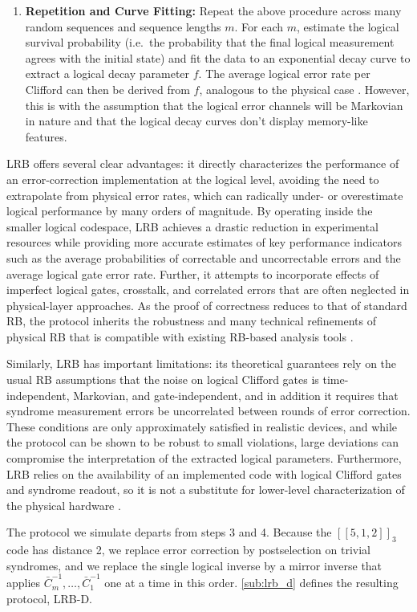 \begin{enumerate}
  \item \textbf{Repetition and Curve Fitting:}
  Repeat the above procedure across many random sequences and sequence
  lengths $m$. For each $m$, estimate the logical survival probability
  (i.e.\ the probability that the final logical measurement agrees with
  the initial state) and fit the data to an exponential decay curve to
  extract a logical decay parameter $f$. The average logical error
  rate per Clifford can then be derived from $f$, analogous
  to the physical case \cite{Magesan2011PRL,Magesan2012PRA,Wallman2018}. However, this is with the assumption that the logical error channels will be Markovian in nature and that the logical decay curves don't display memory-like features.
\end{enumerate}

LRB offers several clear advantages: it directly characterizes the performance of an error-correction implementation at the logical level, avoiding the need to extrapolate from physical error rates, which can radically under- or overestimate logical performance by many orders of magnitude. By operating inside the smaller logical codespace, LRB achieves a drastic reduction in experimental resources while providing more accurate estimates of key performance indicators such as the average probabilities of correctable and uncorrectable errors and the average logical gate error rate. Further, it attempts to incorporate effects of imperfect logical gates, crosstalk, and correlated errors that are often neglected in physical-layer approaches. As the proof of correctness reduces to that of standard RB, the protocol inherits the robustness and many technical refinements of physical RB that is compatible with existing RB-based analysis tools \cite{Combes2017}. 

Similarly, LRB has important limitations: its theoretical guarantees rely on the usual RB
assumptions that the noise on logical Clifford gates is time-independent, Markovian, and gate-independent,
and in addition it requires that syndrome measurement errors be uncorrelated between rounds of error correction. These conditions are only approximately satisfied in realistic devices, and while the protocol can be shown to be robust to small violations, large deviations can compromise the interpretation of the extracted logical parameters. Furthermore, LRB relies on the availability of an implemented code with logical
Clifford gates and syndrome readout, so it is not a substitute for lower-level characterization of the physical hardware \cite{Combes2017}.

The protocol we simulate departs from steps 3 and 4. Because the $[[5,1,2]]_3$ code has distance 2, we replace error correction by postselection on trivial syndromes, and we replace the single logical inverse by a mirror inverse that applies $\bar C_m^{-1},\dots,\bar C_1^{-1}$ one at a time in this order. \autoref{sub:lrb_d} defines the resulting protocol, LRB-D.

